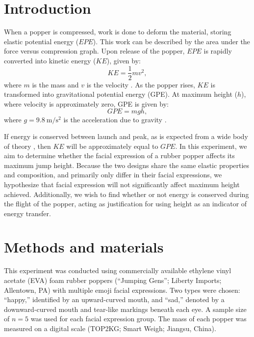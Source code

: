 \documentclass[reprint,amsmath,amssymb,aps,twoside]{revtex4-2} %
\begin{document}






\section{Introduction} 
When a popper is compressed, work is done to deform the material, storing elastic potential energy ($EPE$). This work can be described by the area under the force versus compression graph. 
Upon release of the popper, $EPE$ is rapidly converted into kinetic energy ($KE$), given by:
\begin{equation} 
KE = \frac{1}{2} m v^2,
\label{eq:ke}
\end{equation}
where $m$ is the mass and $v$ is the velocity \cite{tipler}. As the popper rises, $KE$ is transformed into gravitational potential energy (GPE). At maximum height ($h$), where velocity is approximately zero, GPE is given by:
\begin{equation}
GPE = mgh,
\label{eq:gpe}
\end{equation}
where $g=\qty{9.8}{\meter\per\second\squared}$ is the acceleration due to gravity \cite{tipler,barrons,openstax}. 

If energy is conserved between launch and peak, as is expected from a wide body of theory \cite{tipler,barrons,openstax}, then $KE$ will be approximately equal to $GPE$. In this experiment, we aim to determine whether the facial expression of a rubber popper affects its maximum jump height. Because the two designs share the same elastic properties and composition, and primarily only differ in their facial expressions, we hypothesize that facial expression will not significantly affect maximum height achieved. Additionally, we wish to find whether or not energy is conserved during the flight of the popper, acting as justification for using height as an indicator of energy transfer.







\section{Methods and materials} 
This experiment was conducted using commercially available ethylene vinyl acetate (EVA) foam rubber poppers (``Jumping Gens''; Liberty Imports; Allentown, PA) with multiple emoji facial expressions. Two types were chosen: ``happy,'' identified by an upward-curved mouth, and ``sad,'' denoted by a downward-curved mouth and tear-like markings beneath each eye. A sample size of $n=5$ was used for each facial expression group. The mass of each popper was measured on a digital scale (TOP2KG; Smart Weigh; Jiangsu, China). 
\end{document}

